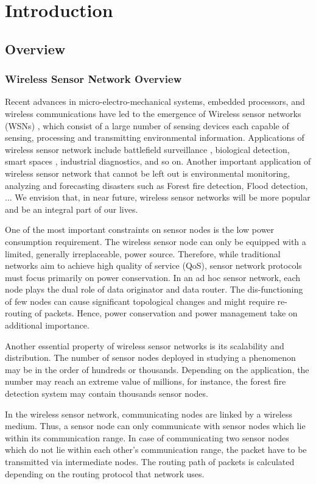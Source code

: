 \chapter{Introduction}
\section{Overview}
\subsection{Wireless Sensor Network Overview}
Recent advances in micro-electro-mechanical systems, embedded processors, and wireless communications have led to the emergence of Wireless sensor networks (WSNs) \cite{wsn-survey}, which consist of a large number of sensing devices each capable of sensing, processing and transmitting environmental information. Applications of wireless sensor network include battlefield surveillance \cite{wsn-app}, biological detection, smart spaces \cite{wsn-app}, industrial diagnostics, and so on. Another important application of wireless sensor network that cannot be left out is environmental monitoring, analyzing and forecasting disasters such as Forest fire detection, Flood detection, ... We envision that, in near future, wireless sensor networks will be more popular and be an integral part of our lives.

One of the most important constraints on sensor nodes is the low power consumption requirement. The wireless sensor node can only be equipped with a limited, generally irreplaceable, power source. Therefore, while traditional networks aim to achieve high quality of service (QoS), sensor network protocols must focus primarily on power conservation. In an ad hoc sensor network, each node plays the dual role of data originator and data router. The dis-functioning of few nodes can cause significant topological changes and might require re-routing of packets. Hence, power conservation and power management take on additional importance.

Another essential property of wireless sensor networks is its scalability and distribution. The number of sensor nodes deployed in studying a phenomenon may be in the order of hundreds or thousands. Depending on the application, the number may reach an extreme value of millions, for instance, the forest fire detection system may contain thousands sensor nodes.

In the wireless sensor network, communicating nodes are linked by a wireless medium. Thus, a sensor node can only communicate with sensor nodes which lie within its communication range. In case of communicating two sensor nodes which do not lie within each other's communication range, the packet have to be transmitted via intermediate nodes. The routing path of packets is calculated depending on the routing protocol that network uses.


